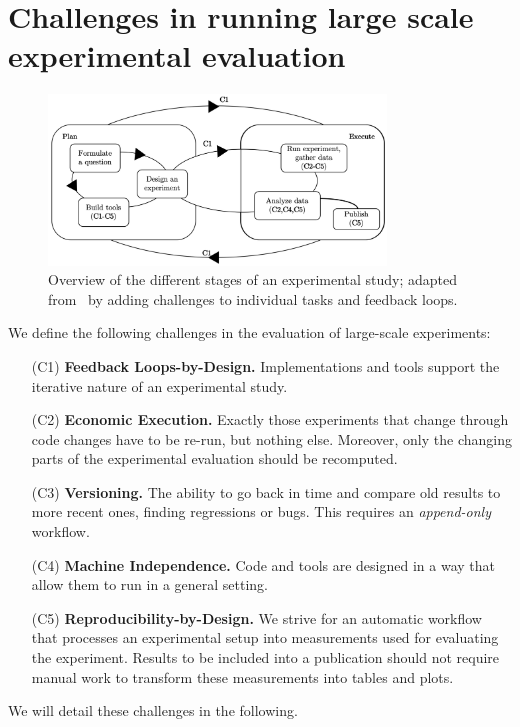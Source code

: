 \documentclass{llncs}
\begin{document}
\section{Challenges in running large scale experimental evaluation}
\begin{figure}[t]
  \centering
  \includegraphics[width=0.8\textwidth]{figs/experiment_scheme.png}
  \caption{Overview of the different stages of an experimental study; adapted from~\cite{DBLP:reference/algo/McGeoch08} by adding challenges to individual tasks and feedback loops.}
  \label{fig:overview}
\end{figure}
We define the following challenges in the  evaluation of large-scale experiments:
\begin{enumerate}
  \item[(C1)] \textbf{Feedback Loops-by-Design.} Implementations and tools support the iterative nature of an experimental study.
  \item[(C2)] \textbf{Economic Execution.} Exactly those experiments that change through code changes have to be re-run, but nothing else. 
  Moreover, only the changing parts of the experimental evaluation should be recomputed.
  \item[(C3)] \textbf{Versioning.} The ability to go back in time and compare old results to more recent ones, finding regressions or bugs. This requires an \emph{append-only} workflow.
  \item[(C4)] \textbf{Machine Independence.} Code and tools are designed in a way that allow them to run in a general setting.
  \item[(C5)] \textbf{Reproducibility-by-Design.} We strive for an automatic workflow that processes an experimental setup into measurements used for evaluating the experiment. Results to be included into a publication should not require manual work to transform these measurements into tables and plots.
\end{enumerate}
%
We will detail these challenges in the following. 
\end{document}
